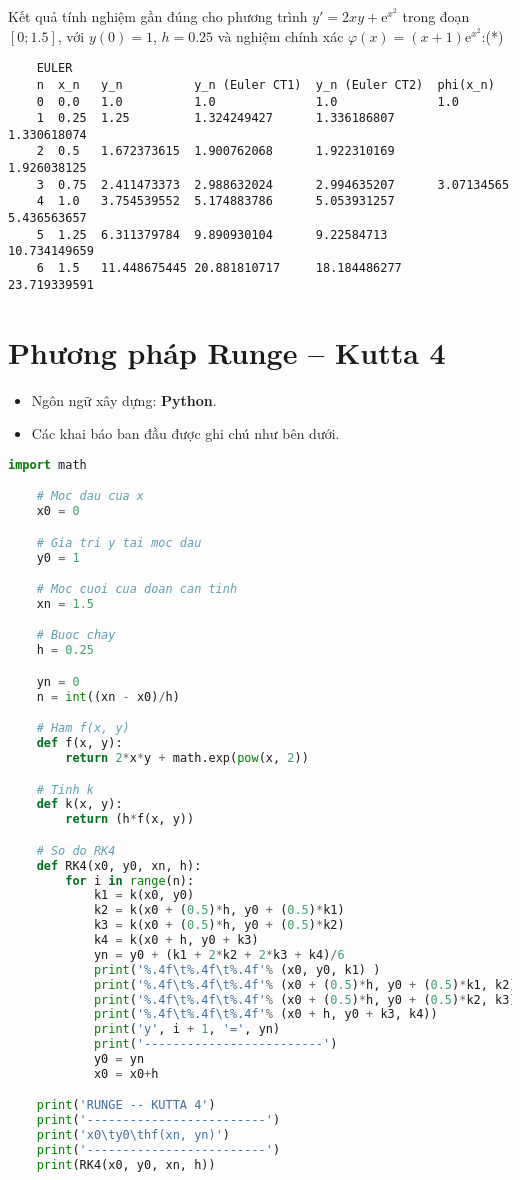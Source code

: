 Kết quả tính nghiệm gần đúng cho phương trình $y'=2xy+\mathrm{e}^{x^2}$ trong đoạn $[0;1.5]$, với $y(0)=1$, $h=0.25$ và nghiệm chính xác $\varphi(x)=(x+1)\mathrm{e}^{x^2}$:\hfill(*)
\begin{lstlisting}
	EULER
	n  x_n   y_n          y_n (Euler CT1)  y_n (Euler CT2)  phi(x_n)
	0  0.0   1.0          1.0              1.0              1.0
	1  0.25  1.25         1.324249427      1.336186807      1.330618074
	2  0.5   1.672373615  1.900762068      1.922310169      1.926038125
	3  0.75  2.411473373  2.988632024      2.994635207      3.07134565
	4  1.0   3.754539552  5.174883786      5.053931257      5.436563657
	5  1.25  6.311379784  9.890930104      9.22584713       10.734149659
	6  1.5   11.448675445 20.881810717     18.184486277     23.719339591
\end{lstlisting}

\section{Phương pháp Runge – Kutta 4}
\begin{itemize}
	\item Ngôn ngữ xây dựng: \textbf{Python}.
	\item Các khai báo ban đầu được ghi chú như bên dưới.
\end{itemize}

\begin{lstlisting}[language=Python]
	import math

	# Moc dau cua x
	x0 = 0

	# Gia tri y tai moc dau
	y0 = 1

	# Moc cuoi cua doan can tinh
	xn = 1.5

	# Buoc chay
	h = 0.25

	yn = 0
	n = int((xn - x0)/h)

	# Ham f(x, y)
	def f(x, y):
		return 2*x*y + math.exp(pow(x, 2))

	# Tinh k
	def k(x, y):
		return (h*f(x, y))

	# So do RK4
	def RK4(x0, y0, xn, h):
	    for i in range(n):
	        k1 = k(x0, y0)
	        k2 = k(x0 + (0.5)*h, y0 + (0.5)*k1)
	        k3 = k(x0 + (0.5)*h, y0 + (0.5)*k2)
	        k4 = k(x0 + h, y0 + k3)
	        yn = y0 + (k1 + 2*k2 + 2*k3 + k4)/6
	        print('%.4f\t%.4f\t%.4f'% (x0, y0, k1) )
	        print('%.4f\t%.4f\t%.4f'% (x0 + (0.5)*h, y0 + (0.5)*k1, k2))
	        print('%.4f\t%.4f\t%.4f'% (x0 + (0.5)*h, y0 + (0.5)*k2, k3))
	        print('%.4f\t%.4f\t%.4f'% (x0 + h, y0 + k3, k4))
	        print('y', i + 1, '=', yn)
	        print('-------------------------')
	        y0 = yn
	        x0 = x0+h

	print('RUNGE -- KUTTA 4')
	print('-------------------------')    
	print('x0\ty0\thf(xn, yn)')
	print('-------------------------')
	print(RK4(x0, y0, xn, h))
\end{lstlisting}

